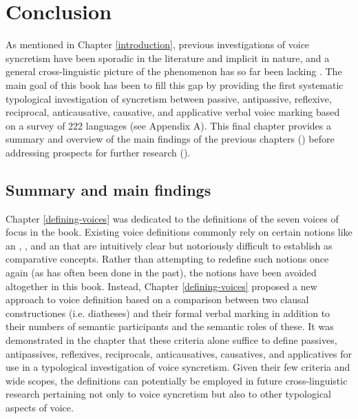 \chapter{Conclusion} \label{conclusion}
As mentioned in Chapter \ref{introduction}, previous investigations of voice syncretism have been sporadic in the literature and implicit in nature, and a general cross-linguistic picture of the phenomenon has so far been lacking \citep[3f.]{malchukov:2017}. The main goal of this book has been to fill this gap by providing the first systematic typological investigation of syncretism between passive, antipassive, reflexive, reciprocal, anticausative, causative, and applicative verbal voiec marking based on a survey of 222 languages (see Appendix A). This final chapter provides a summary and overview of the main findings of the previous chapters () before addressing prospects for further research ().
 
\section{Summary and main findings} \label{conclusion:summary}
Chapter \ref{defining-voices} was dedicated to the definitions of the seven voices of focus in the book. Existing voice definitions commonly rely on certain notions like an , ,  and an  that are intuitively clear but notoriously difficult to establish as comparative concepts. Rather than attempting to redefine such notions once again (as has often been done in the past), the notions have been avoided altogether in this book. Instead, Chapter \ref{defining-voices} proposed a new approach to voice definition based on a comparison between two clausal constructiones (i.e. diatheses) and their formal verbal marking in addition to their numbers of semantic participants and the semantic roles of these. It was demonstrated in the chapter that these criteria alone suffice to define passives, antipassives, reflexives, reciprocals, anticausatives, causatives, and applicatives for use in a typological investigation of voice syncretism. Given their few criteria and wide scopes, the definitions can potentially be employed in future cross-linguistic research pertaining not only to voice syncretism but also to other typological aspects of voice.

